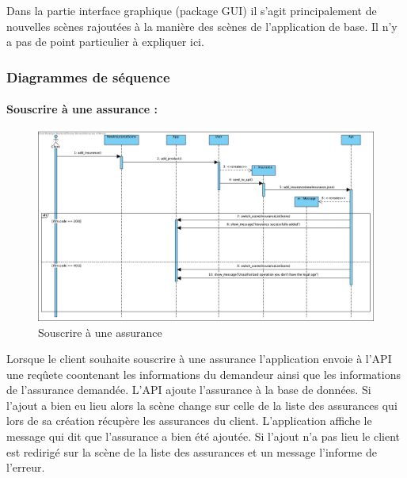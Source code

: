 \documentclass[../rapport.tex]{subfiles}
\begin{document}
		\bigskip

		Dans la partie interface graphique (package GUI) il s'agit principalement de nouvelles 
		scènes rajoutées à la manière des scènes de l'application de base. Il n'y a pas de 
		point particulier à expliquer ici.
		
		\subsubsection{Diagrammes de séquence}
				\paragraph{Souscrire à une assurance :}
						\begin{figure}[h!]
								\centering\includegraphics[scale=0.3]{ressources/photos_diagrammes/extensionThomas/souscrireAssurance.jpg}
								\caption{Souscrire à une assurance}
						\end{figure}
					Lorsque le client souhaite souscrire à une assurance l'application envoie à l'API une reqûete coontenant les informations du demandeur ainsi que les informations de l'assurance
					demandée. L'API ajoute l'assurance à la base de données. Si l'ajout a bien eu lieu alors la scène change sur celle de la liste des assurances qui lors de sa création récupère
					les assurances du client. L'application affiche le message qui dit que l'assurance a bien été ajoutée.
					\medskip
					Si l'ajout n'a pas lieu le client est redirigé sur la scène de la liste des assurances et un message l'informe de l'erreur.
\newpage
\end{document}
